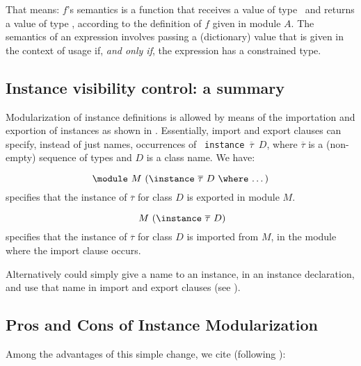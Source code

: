 That means: $f$'s semantics is a function that receives a value of
type \String\ and returns a value of type \String, according to the
definition of $f$ given in module $A$. The semantics of an expression
involves passing a (dictionary) value that is given in the context of
usage if, {\em and only if}, the expression has a constrained type.

\subsection{Instance visibility control: a summary}
\label{subsec:instance-visibility-control}

Modularization of instance definitions is allowed by means of the
importation and exportion of instances as shown in
\cite{Controlling-scope-instances}. Essentially, import and export
clauses can specify, instead of just names, occurrences of {\tt
  instance $\overline{\tau}$ $D$}, where $\overline{\tau}$ is a
(non-empty) sequence of types and $D$ is a class name.  We have:

  \[ \text{\module\ $M$ (\instance\ $\overline{\tau}$ $D$ \where\ \ldots)} \]
specifies that the instance of $\overline{\tau}$ for class $D$ is
exported in module $M$.

  \[ \text{\ $M$ (\instance\ $\overline{\tau}$ $D$)} \]
specifies that the instance of $\overline{\tau}$ for class $D$ is
imported from $M$, in the module where the import clause occurs.

Alternatively could simply give a name to an instance, in an instance
declaration, and use that name in import and export clauses (see
\cite{Controlling-scope-instances}).

\subsection{Pros and Cons of Instance Modularization}

Among the advantages of this simple change, we cite (following
\cite{Controlling-scope-instances}):

